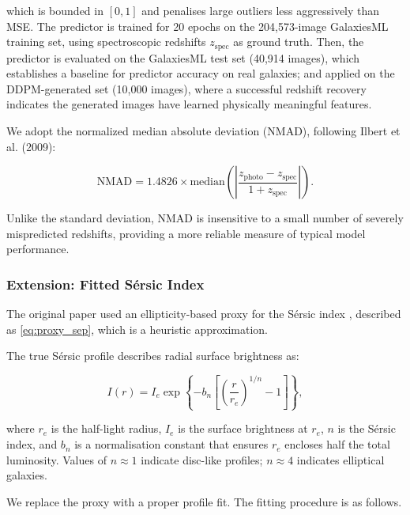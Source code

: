 \documentclass[fleqn,usenatbib]{mnras}
\begin{document}
which is bounded in $[0,1]$ and penalises large outliers less
aggressively than MSE.
The predictor is trained for 20 epochs on the 204,573-image
GalaxiesML training set, using spectroscopic redshifts
$z_{\mathrm{spec}}$ as ground truth.
Then, the predictor is evaluated on the GalaxiesML test set
(40,914 images), which establishes a baseline for predictor accuracy
on real galaxies; and applied on the DDPM-generated set (10,000 images), where
a successful redshift recovery indicates the generated images have
learned physically meaningful features.


We adopt the normalized median absolute deviation (NMAD), following Ilbert et al. (2009):

\begin{equation}
    \mathrm{NMAD} = 1.4826 \times
        \mathrm{median}\!\left(
            \left|
                \frac{z_{\mathrm{photo}} - z_{\mathrm{spec}}}
                     {1 + z_{\mathrm{spec}}}
            \right|
        \right).
    \label{eq:nmad}
\end{equation}

Unlike the standard deviation, NMAD is insensitive to a small number of severely mispredicted redshifts, providing a more reliable measure of typical model performance.


\subsubsection{Extension: Fitted S\'{e}rsic Index}
\label{sec:sersic}

The original paper used an ellipticity-based proxy for the
S\'{e}rsic index \citep{lizarraga2024}, described as \ref{eq:proxy_sep}, which is a heuristic approximation.

The true S\'{e}rsic profile \citep{sersic1963} describes radial
surface brightness as:

\begin{equation}
    I(r) = I_e \exp\!\left\{
        -b_n \!\left[
            \left(\frac{r}{r_e}\right)^{1/n} - 1
        \right]
    \right\},
    \label{eq:sersic}
\end{equation}

where $r_e$ is the half-light radius, $I_e$ is the surface brightness
at $r_e$, $n$ is the S\'{e}rsic index, and $b_n$ is a normalisation
constant that ensures $r_e$ encloses half the total luminosity.
Values of $n \approx 1$ indicate disc-like profiles; $n \approx 4$
indicates elliptical galaxies.

We replace the proxy with a proper profile fit. The fitting
procedure is as follows.
\end{document}
